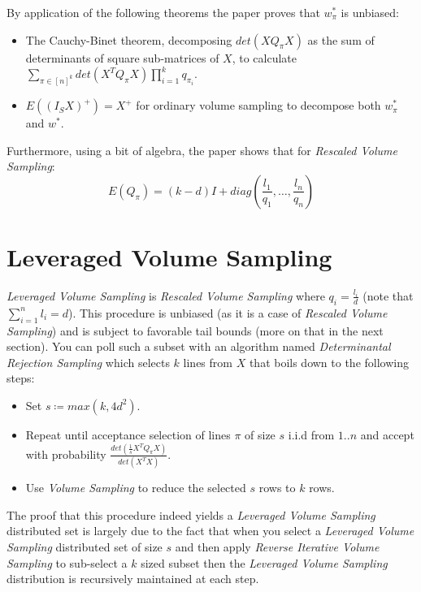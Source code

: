 \documentclass{article}
\begin{document}
        By application of the following theorems the paper proves that $w_{\pi}^\ast$ is unbiased:
        \begin{itemize}
            \item The Cauchy-Binet theorem, decomposing $det(XQ_{\pi}X)$ as the sum of determinants of square sub-matrices of $X$, to calculate $\sum_{\pi \in [n]^k}det(X^{T}Q_{\pi}X)\prod_{i=1}^{k}q_{\pi_{i}}$.
            \item $E((I_{S}X)^+) = X^+$ for ordinary volume sampling to decompose both $w_{\pi}^\ast$ and $w^\ast$.
        \end{itemize}

        Furthermore, using a bit of algebra, the paper shows that for \textit{Rescaled Volume Sampling}:
        \begin{equation}
            E(Q_{\pi}) = (k-d)I + diag(\frac{l_{1}}{q_{1}}, \hdots, \frac{l_{n}}{q_{n}})
        \end{equation}

    \section{Leveraged Volume Sampling}
        \textit{Leveraged Volume Sampling} is \textit{Rescaled Volume Sampling} where $q_{i}=\frac{l_{i}}{d}$ (note that $\sum_{i=1}^{n}l_{i}=d$).
        This procedure is unbiased (as it is a case of \textit{Rescaled Volume Sampling}) and is subject to favorable tail bounds (more on that in the next section).
        You can poll such a subset with an algorithm named \textit{Determinantal Rejection Sampling} which selects $k$ lines from $X$ that boils down to the following steps:
        \begin{itemize}
            \item Set $s \coloneqq max(k, 4d^{2})$.
            \item Repeat until acceptance selection of lines $\pi$ of size $s$ i.i.d from $1..n$ and accept with probability $\frac{det(\frac{1}{s}X^{T}Q_{\pi}X)}{det(X^{T}X)}$.
            \item Use \textit{Volume Sampling} to reduce the selected $s$ rows to $k$ rows.
        \end{itemize}

        The proof that this procedure indeed yields a \textit{Leveraged Volume Sampling} distributed set is largely due to the fact that when you
        select a \textit{Leveraged Volume Sampling} distributed set of size $s$ and then apply \textit{Reverse Iterative Volume Sampling} to sub-select
        a $k$ sized subset then the \textit{Leveraged Volume Sampling} distribution is recursively maintained at each step.
\end{document}
